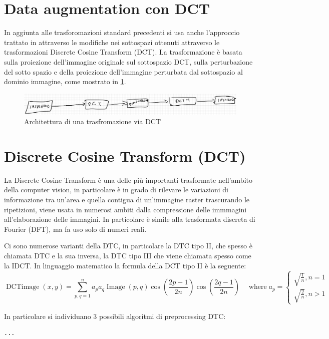 \section{Data augmentation con DCT}\label{data-augmentation-con-dct}

In aggiunta alle trasforomazioni standard precedenti si usa anche l'approccio trattato in \cite{nanni_dtc_pca} attraverso le modifiche nei sottospazi ottenuti attraverso le trasformazioni Discrete Cosine
Transform (DCT). La trasformazione è basata sulla proiezione dell'immagine originale sul sottospazio DCT, sulla perturbazione del sotto spazio e della proiezione dell'immagine perturbata dal sottospazio al dominio immagine, come mostrato in \cref{fig:dct-schema}.

\begin{figure}[ht]
    \centering
    \includegraphics[width=1\textwidth]{data-augmentation/dct-trasformazione.PNG}
    \caption{Architettura di una trasfromazione via DCT}
    \label{fig:dct-schema}
\end{figure}


\section{Discrete Cosine Transform (DCT)}\label{discrete-cosine-transform-dct}


La Discrete Cosine Transform è una delle più importanti trasformate nell'ambito della computer vision, in particolare è in grado di rilevare le  variazioni di informazione tra un'area e quella contigua di un'immagine raster trascurando le ripetizioni, viene usata in numerosi ambiti dalla compressione delle immmagini all'elaborazione delle immagini. In particolare è simile alla  trasformata discreta di Fourier (DFT), ma fa uso solo di numeri reali\cite{syed_dct}.

Ci sono numerose varianti della DTC, in particolare la DTC tipo II, che spesso è chiamata DTC e la sua inversa, la DTC tipo III che viene chiamata spesso come la IDCT. In linguaggio matematico la formula della DCT tipo II è la seguente\cite{syed_dct}\cite{nanni_dtc_pca}:
\[\operatorname{DCTimage} ( x , y ) = \sum _ { p , q = 1 } ^ { n } a _ { p } a _ { q } \operatorname { Image } ( p , q ) \cos \left(\frac { 2 p - 1 } { 2 n }\right) \cos \left(\frac { 2 q - 1 } { 2 n }\right) \quad \operatorname{where}  a _ { p } = \left\{ \begin{array} { l } \sqrt { \frac { 1 } { n } } , n = 1 \\ \sqrt { \frac { 2 } { n } } , n > 1 \end{array} \right.\]

In particolare si individuano 3 possibili algoritmi di preprocessing DTC:
\begin{lstlisting}
...
\end{lstlisting}
